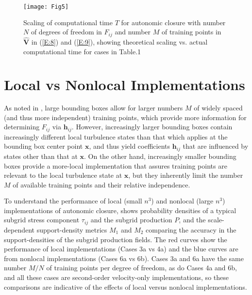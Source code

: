 %
\begin{figure}
	\begin{center}
	\texttt{[image: Fig5]}
	\caption{ Scaling of computational time $T$ for autonomic closure with number $N$ of degrees of freedom in $F_{ij}$ and number $M$ of training points in $\widehat{\mathbf{V}}$ in (\ref{E:8}) and (\ref{E:9}), showing theoretical scaling vs. actual computational time for cases in Table.1}
	\label{F:5}
	\end{center}
\end{figure}
%
%

\section{Local vs Nonlocal Implementations} 
\label{sec:IVB}

As noted in , large bounding boxes allow for larger numbers $M$ of widely spaced (and thus more independent) training points, which provide more information for determining $F_{ij}$  via $\mathbf{h}_{ij}$. However, increasingly larger bounding boxes contain increasingly different local turbulence states than that which applies at the bounding box center point $\mathbf{x}$, and thus yield coefficients $\mathbf{h}_{ij}$  that are influenced by states other than that at $\mathbf{x}$. On the other hand, increasingly smaller bounding boxes provide a more-local implementation that assures training points are relevant to the local turbulence state at $\mathbf{x}$, but they inherently limit the number $M$ of available training points and their relative independence.  

To understand the performance of local (small $n^3$) and nonlocal (large $n^3$) implementations of autonomic closure,  shows probability densities of a typical subgrid stress component  $\tau_{ij}$ and the subgrid production $P$, and the scale-dependent support-density metrics $M_1$ and $M_2$  comparing the accuracy in the support-densities of the subgrid production fields. The red curves show the performance of local implementations (Cases 3a vs 4a) and the blue curves are from nonlocal implementations (Cases 6a vs 6b). Cases 3a and 6a have the same number $M/N$  of training points per degree of freedom, as do Cases 4a and 6b, and all these cases are second-order velocity-only implementations, so these comparisons are indicative of the effects of local versus nonlocal implementations. 


